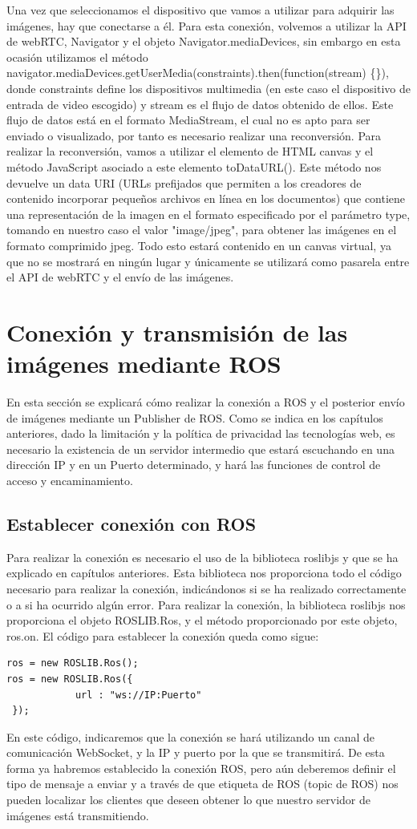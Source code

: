 Una vez que seleccionamos el dispositivo que vamos a utilizar para adquirir las imágenes, hay que conectarse a él. Para esta conexión, volvemos a utilizar la API de webRTC, Navigator y el objeto Navigator.mediaDevices, sin embargo en esta ocasión utilizamos el método navigator.mediaDevices.getUserMedia(constraints).then(function(stream) \{\}), donde constraints define los dispositivos multimedia (en este caso el dispositivo de entrada de video escogido) y stream es el flujo de datos obtenido de ellos.
Este flujo de datos está en el formato MediaStream, el cual no es apto para ser enviado o visualizado, por tanto es necesario realizar una reconversión. Para realizar la reconversión, vamos a utilizar el elemento de HTML canvas y el método JavaScript asociado a este elemento toDataURL(). Este método nos devuelve un data URI (URLs prefijados que permiten a los creadores de contenido incorporar pequeños archivos en línea en los documentos) que contiene una representación de la imagen en el formato especificado por el parámetro type, tomando en nuestro caso el valor "image/jpeg", para obtener las imágenes en el formato comprimido jpeg. Todo esto estará contenido en un canvas virtual, ya que no se mostrará en ningún lugar y únicamente se utilizará como pasarela entre el API de webRTC y el envío de las imágenes.

\section{Conexión y transmisión de las imágenes mediante ROS}
En esta sección se explicará cómo realizar la  conexión a ROS y el posterior envío de imágenes mediante un Publisher de ROS. Como se indica en los capítulos anteriores, dado la limitación y la política de privacidad las tecnologías web, es necesario la existencia de un servidor intermedio que estará escuchando en una dirección IP y en un Puerto determinado, y hará las funciones de control de acceso y encaminamiento.

\subsection{Establecer conexión con ROS}
Para realizar la conexión es necesario el uso de la biblioteca roslibjs y que se ha explicado en capítulos anteriores. Esta biblioteca nos proporciona todo el código necesario para realizar la conexión, indicándonos si se ha realizado correctamente o a si ha ocurrido algún error. Para realizar la conexión, la biblioteca roslibjs nos proporciona el objeto ROSLIB.Ros, y el método proporcionado por este objeto, ros.on. El código para establecer la conexión queda como sigue:
\begin{lstlisting}[frame=single]
ros = new ROSLIB.Ros();
ros = new ROSLIB.Ros({
            url : "ws://IP:Puerto"
 });
\end{lstlisting}
En este código, indicaremos que la conexión se hará utilizando un canal de comunicación WebSocket, y la IP y puerto por la que se transmitirá. De esta forma ya habremos establecido la conexión ROS, pero aún deberemos definir el tipo de mensaje a enviar y a través de que etiqueta de ROS (topic de ROS) nos pueden localizar los clientes que deseen obtener lo que nuestro servidor de imágenes está transmitiendo.

